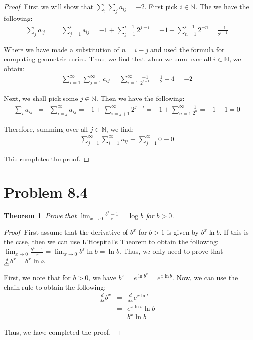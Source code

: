\documentclass[psamsfonts]{amsart}
\newtheorem{thm}{Theorem}[section]
\theoremstyle{definition}
\theoremstyle{remark}
\numberwithin{equation}{section}
\begin{document}
\begin{proof}
First we will show that $\sum_i \sum_j a_{ij} = -2$. First pick $i \in \mathbb{N}$. The we have the following:
\begin{eqnarray}
\sum_{j} a_{ij} &=& \sum_{j=1}^i a_{ij} = -1 + \sum_{j=1}^{i-1} 2^{j-i}= -1 + \sum_{n=1}^{i-1} 2^{-n} = \frac{-1}{2^{i-1}}
\end{eqnarray}

Where we have made a substitution of $n = i - j$ and used the formula for computing geometric series. Thus, we find that when we sum over all $i \in \mathbb{N}$, we obtain:
\begin{eqnarray}
\sum_{i=1}^\infty \sum_{j=1}^\infty a_{ij} = \sum_{i=1}^\infty \frac{-1}{2^{i-1}} = \frac{1}{2} -4 = -2
\end{eqnarray} 

Next, we shall pick some $j \in \mathbb{N}$. Then we have the following:
\begin{eqnarray}
\sum_i a_{ij} &=& \sum_{i=j}^\infty a_{ij} = -1 + \sum_{i=j+1}^\infty 2^{j-i} = -1 + \sum_{n = 1}^\infty \frac{1}{2^n} = -1 + 1 = 0
\end{eqnarray}

Therefore, summing over all $j \in \mathbb{N}$, we find:
\begin{eqnarray}
\sum_{j=1}^\infty \sum_{i=1}^\infty a_{ij} = \sum_{j=1}^\infty 0 = 0 
\end{eqnarray}

This completes the proof.
\end{proof}

\section{Problem 8.4}

\begin{thm}
Prove that $\lim_{x \to 0} \frac{b^x - 1}{x} = \log b$ for $b> 0$. 
\end{thm}

\begin{proof}
First assume that the derivative of $b^x$ for $b > 1$ is given by $b^x \ln b$. If this is the case, then we can use L'Hospital's Theorem to obtain the following: $\lim_{x \to 0} \frac{b^x - 1}{x} = \lim_{x \to 0} b^x \ln b = \ln b$. Thus, we only need to prove that $\frac{d}{dx} b^x = b^x \ln b$. 

First, we note that for $b>0$, we have $b^x = e^{\ln b^x} = e^{ x \ln b}$. Now, we can use the chain rule to obtain the following:
\begin{eqnarray}
\frac{d}{dx} b^x &=& \frac{d}{dx} e^{x \ln b} \\
&=& e^{x \ln b} \ln b  \\
&=& b^x \ln b
\end{eqnarray}

Thus, we have completed the proof.
\end{proof}
\end{document}
